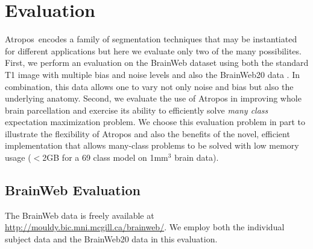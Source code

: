 \documentclass[11pt,english]{article}
\begin{document}
\section{Evaluation}
Atropos~encodes a family of segmentation techniques that may be
instantiated for different applications but here we evaluate only two
of the many possibilites. First, we perform an evaluation on the
BrainWeb dataset using both the standard T1 image with multiple bias
and noise levels and also the BrainWeb20 data
\citep{Aubert-Broche2006a,Battaglini2008}.  In combination, this data
allows one to vary not only noise and bias but also the underlying
anatomy.  Second, we evaluate the use of Atropos in improving whole
brain parcellation and exercise its ability to efficiently solve {\em
many class} expectation maximization problem.  We choose this
evaluation problem in part to illustrate the flexibility of Atropos
and also the benefits of the novel, efficient implementation that
allows many-class problems to be solved with low memory usage ($<$2GB
for a 69 class model on 1mm$^3$ brain data).


\subsection{BrainWeb Evaluation}
\label{sec:bweb} The BrainWeb data is freely available at
\url{http://mouldy.bic.mni.mcgill.ca/brainweb/}.  We employ both the
individual subject data and the BrainWeb20 data in this evaluation.
\end{document}
